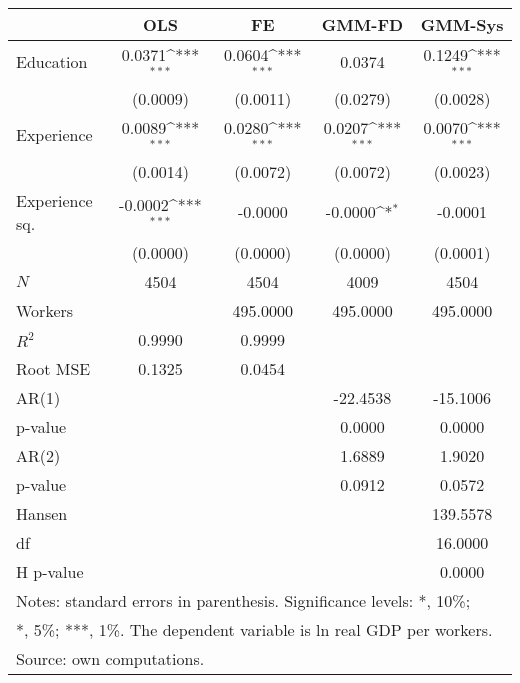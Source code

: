 {
\def\sym#1{\ifmmode^{#1}\else\(^{#1}\)\fi}
\begin{tabular}{l*{4}{c}}
\hline\hline
            &\multicolumn{1}{c}{OLS}&\multicolumn{1}{c}{FE}&\multicolumn{1}{c}{GMM-FD}&\multicolumn{1}{c}{GMM-Sys}\\
\hline
Education   &      0.0371\sym{***}&      0.0604\sym{***}&      0.0374         &      0.1249\sym{***}\\
            &    (0.0009)         &    (0.0011)         &    (0.0279)         &    (0.0028)         \\
[1em]
Experience  &      0.0089\sym{***}&      0.0280\sym{***}&      0.0207\sym{***}&      0.0070\sym{***}\\
            &    (0.0014)         &    (0.0072)         &    (0.0072)         &    (0.0023)         \\
[1em]
Experience sq.&     -0.0002\sym{***}&     -0.0000         &     -0.0000\sym{*}  &     -0.0001         \\
            &    (0.0000)         &    (0.0000)         &    (0.0000)         &    (0.0001)         \\
\hline
\(N\)       &        4504         &        4504         &        4009         &        4504         \\
Workers     &                     &    495.0000         &    495.0000         &    495.0000         \\
$R^{2}$     &      0.9990         &      0.9999         &                     &                     \\
Root MSE    &      0.1325         &      0.0454         &                     &                     \\
AR(1)       &                     &                     &    -22.4538         &    -15.1006         \\
p-value     &                     &                     &      0.0000         &      0.0000         \\
AR(2)       &                     &                     &      1.6889         &      1.9020         \\
p-value     &                     &                     &      0.0912         &      0.0572         \\
Hansen      &                     &                     &                     &    139.5578         \\
df          &                     &                     &                     &     16.0000         \\
H p-value   &                     &                     &                     &      0.0000         \\
\hline\hline
\multicolumn{5}{l}{\footnotesize Notes: standard errors in parenthesis. Significance levels: *, 10\%;}\\
\multicolumn{5}{l}{\footnotesize **, 5\%; ***, 1\%. The dependent variable is ln real GDP per workers.}\\
\multicolumn{5}{l}{\footnotesize Source: own computations.}\\
\end{tabular}
}

